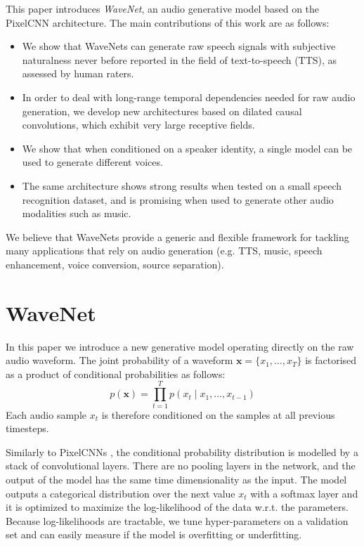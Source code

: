 \documentclass{article}
\makeatletter
\renewcommand{\vec}{\mathbf}
\newcommand*{\eg}{e.g.\@\xspace}
\makeatother
\begin{document}
This paper introduces \emph{WaveNet}, an audio generative model based on the PixelCNN \citep{van2016pixel, ConditionalPixelCNN} architecture. The main contributions of this work are as follows:
\begin{itemize}
    \item We show that WaveNets can generate raw speech signals with subjective naturalness never before reported in the field of text-to-speech (TTS), as assessed by human raters.
    \item In order to deal with long-range temporal dependencies needed for raw audio generation, we develop new architectures based on dilated causal convolutions, which exhibit very large receptive fields.
    \item We show that when conditioned on a speaker identity, a single model can be used to generate different voices.
    \item The same architecture shows strong results when tested on a small speech recognition dataset, and is promising when used to generate other audio modalities such as music.
\end{itemize}

We believe that WaveNets provide a generic and flexible framework for tackling many applications that rely on audio generation (\eg TTS, music, speech enhancement, voice conversion, source separation).
 
\section{WaveNet}
\label{sec:wavenet}
In this paper we introduce a new generative model operating directly on the raw audio waveform.  
The joint probability of a waveform $\vec{x} = \{ x_1, \dots, x_T \}$ is factorised as a product of conditional probabilities as follows:
\begin{equation}
p\left(\vec{x}\right) = \prod_{t=1}^{T} p\left(x_t \mid x_1, \dots ,x_{t-1}\right)
\label{eq:px}
\end{equation}
Each audio sample $x_t$ is therefore conditioned on the samples at all previous timesteps.

Similarly to PixelCNNs \citep{van2016pixel, ConditionalPixelCNN}, the conditional probability distribution is modelled by a stack of convolutional layers. There are no pooling layers in the network, and the output of the model has the same time dimensionality as the input. The model outputs a categorical distribution over the next value $x_{t}$ with a softmax layer and it is optimized to maximize the log-likelihood of the data w.r.t. the parameters. Because log-likelihoods are tractable, we tune hyper-parameters on a validation set and can easily measure if the model is overfitting or underfitting.
\end{document}
